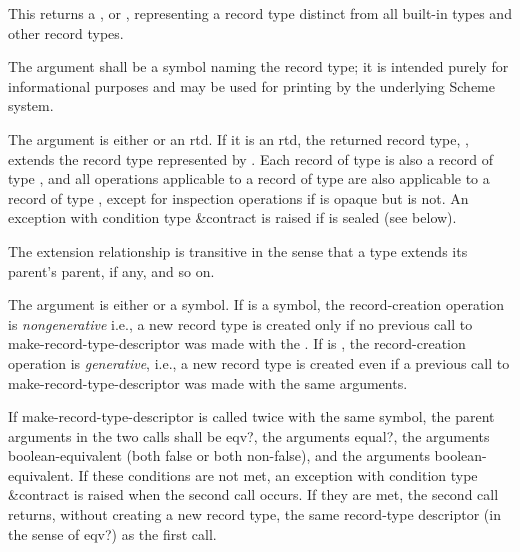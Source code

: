 \begin{entry}{%
}
   
This returns a , or ,
representing a record type distinct from all built-in types and
other record types.

The  argument shall be a symbol naming the record type; it is
intended purely for informational purposes and may be used for printing by
the underlying Scheme system.

The  argument is either \schfalse{} or an rtd. If it is an
rtd, the returned record type, , extends the record type
 represented by . Each record of type  is also a
record of type , and all operations applicable to a record of
type  are also applicable to a record of type , except for
inspection operations if  is opaque but  is not. An exception with
condition type {\cf\&contract} is raised if  is sealed (see below).
   
The extension relationship is transitive in the sense that a type extends
its parent's parent, if any, and so on.
   
The  argument is either \schfalse{} or a symbol.
If  is a symbol, the record-creation operation is
\emph{nongenerative} i.e., a new record type is created only
if no previous call to {\cf make-record-type-descriptor}
was made with the .
If  is \schfalse{}, the record-creation operation is
\emph{generative}, i.e., a new record type is created even if
a previous call to {\cf make-record-type-descriptor} was
made with the same arguments.

If {\cf make-record-type-descriptor} is
called twice with the same  symbol, the parent
arguments in the two calls shall be {\cf eqv?}, the 
arguments {\cf equal?}, the  arguments boolean-equivalent
(both false or both non-false), and the  arguments
boolean-equivalent.
If these conditions are not met, an exception with condition type
{\cf\&contract} is raised when the second call occurs.
If they are met, the second call returns, without creating a new
record type, the same record-type descriptor
(in the sense of {\cf eqv?}) as the first call.


\end{entry}
